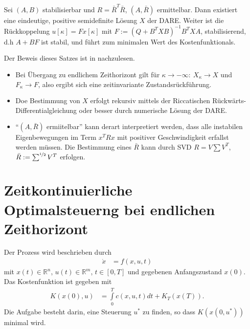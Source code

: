 \begin{satz}
Sei $(A,B)$ stabilisierbar und $R=\bar{R}^T\bar{R}$, $(A,\bar{R})$ ermittelbar. Dann existiert eine eindeutige, positive semidefinite Lösung $X$ der \ac{DARE}. Weiter ist die
Rückkoppelung $u[\kappa]=F x[\kappa]$ mit $F:=\left(Q+B^TXB \right)^{-1}B^TXA$, stabilisierend, d.h $A+BF$ ist stabil, und führt zum minimalen Wert des Kostenfunktionals.
\end{satz}
Der Beweis dieses Satzes ist in \cite{ludyk1995theoretische} nachzulesen.
\begin{remark}\hspace{1mm}
\begin{itemize}
  \item Bei Übergang zu endlichem Zeithorizont gilt für $\kappa\rightarrow -\infty:\ X_{\kappa}\rightarrow X$ und $F_{\kappa}\rightarrow F$, also ergibt sich eine zeitinvariante
  Zustandsrückführung.
  \item Doe Bestimmung von $X$ erfolgt rekursiv mittels der Riccatischen Rückwärts-Differentialgleichung oder besser durch numerische Lösung der \ac{DARE}.
  \item "`$(A,\bar{R})$ ermiitelbar"' kann derart interpretiert werden, dass alle instabilen Eigenbewegungen im Term $x^TRx$ mit positiver Geschwindigkeit erfallst werden müssen. Die
  Bestimmung eines $\bar{R}$ kann durch \ac{SVD} $R=V\sum V^T$, $\bar{R}:=\sum^{\nicefrac12}V^T$ erfolgen. 
\end{itemize}
\end{remark}

\section{Zeitkontinuierliche Optimalsteuerng bei endlichen Zeithorizont}
\label{sec:3_3_zeitkont_opt_endl}
Der Prozess wird beschrieben durch
\begin{align}
	\dot{x} & = f(x,u,t)
\end{align}
mit $x(t)\in\mathbb{R}^n$, $u(t)\in\mathbb{R}^m$, $t\in[0,T]$ und gegebenen Anfangszustand $x(0)$.\\
Das Kostenfunktion ist gegeben mit
\begin{align}
	K(x(0),u) & = \int\limits_0^T c(x,u,t)dt + K_T(x(T)).
\end{align}
Die Aufgabe besteht darin, eine Steuerung $u^{\ast}$ zu finden, so dass $K\left(x(0,u^{\ast}) \right)$ minimal wird.
